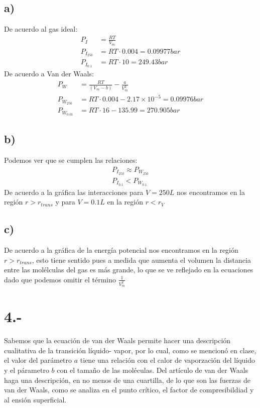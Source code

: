 \documentclass{article}
\begin{document}
\begin{tcolorbox}[breakable]
    \subsection*{a)}
    De acuerdo al gas ideal:
    \begin{align*}
        P_{I} 
        &= \frac{RT}{V_m} \\
        P_{I_{250}}
        &= RT \cdot 0.004 = 0.09977 bar\\ 
        P_{I_{0.1}}
        &= RT \cdot 10 = 249.43 bar 
    \end{align*}
    De acuerdo a Van der Waals:
    \begin{align*}
        P_{W}
        &= \frac{RT}{(V_m - b)} - \frac{a}{V_m^2} \\
        P_{W_{250}}
        &= RT \cdot 0.004 - 2.17\times 10^{-5} = 0.09976 bar \\
        P_{W_{0.01}}
        &= RT \cdot 16 - 135.99 = 270.905 bar 
    \end{align*}

    \subsection*{b)}
    Podemos ver que se cumplen las relaciones:
    \begin{align*}
        P_{I_{250}} \approx P_{W_{250}} \\
        P_{I_{0.1}} < P_{W_{0.1}}
    \end{align*}
    De acuerdo a la gráfica las interacciones para $V=250L$ nos encontramos en 
    la región $r > r_{trans}$ y para $V=0.1L$ en la región $r < r_V$

    \subsection*{c)}
    De acuerdo a la gráfica de la energía potencial nos encontramos en la región 
    $r > r_{trans}$, esto tiene sentido pues a medida que aumenta el volumen 
    la distancia entre las molélculas del gas es más grande, lo que se ve reflejado  
    en la ecuaciones dado que podemos omitir el término $\frac{1}{V_m^2}$


\end{tcolorbox}
\section*{4.-}
Sabemos que la ecuación de van der Waals permite hacer una descripción cualitativa 
de la transición líquido- vapor, por lo cual, como se mencionó en clase, el 
valor del parámetro $a$ tiene una relación con el calor de vaporzación del líquido y 
el párametro $b$  con el tamaño de las moléculas. Del artículo de van der Waals haga 
una descripción, en no menos de una cuartilla, de lo que son las fuerzas de 
van der Waals, como se analiza en el punto crítico, el factor de compresibildiad y al 
ensión superficial.
\end{document}
